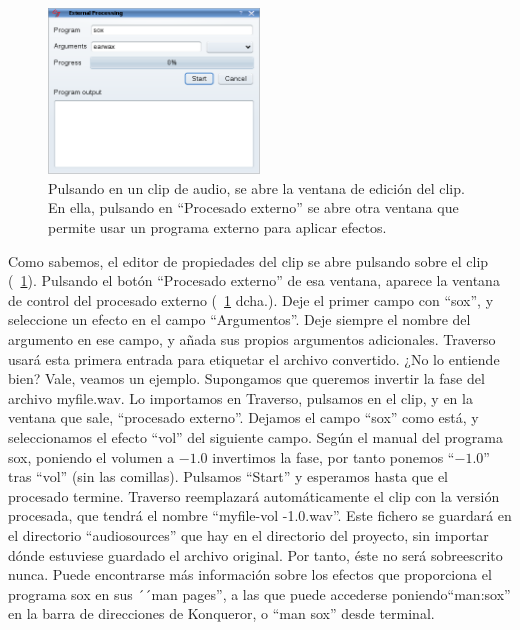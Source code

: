 \begin{figure}
	\centering
	\includegraphics[width=0.5\textwidth]{../images/external00}
	\caption{Pulsando  en un clip de audio, se abre la ventana de edición del clip. En ella, pulsando en ``Procesado externo'' se abre otra ventana que permite usar un programa externo para aplicar efectos.}
	\label{fig_external01}
\end{figure}

Como sabemos, el editor de propiedades del clip se abre pulsando  sobre el clip (\FigB~\ref{fig_external01}). Pulsando  el botón ``Procesado externo'' de esa ventana, aparece la ventana de control del procesado externo (\FigB~\ref{fig_external01} dcha.). Deje el primer campo con ``sox'', y seleccione un efecto en el campo ``Argumentos''. Deje siempre el nombre del argumento en ese campo, y añada sus propios argumentos adicionales. Traverso usará esta primera entrada para etiquetar el archivo convertido. ¿No lo entiende bien? Vale, veamos un ejemplo. Supongamos que queremos invertir la fase del archivo myfile.wav. Lo importamos en Traverso, pulsamos  en el clip, y en la ventana que sale, ``procesado externo''. Dejamos el campo ``sox'' como está, y seleccionamos el efecto ``vol'' del siguiente campo. Según el manual del programa sox, poniendo el volumen a $-1.0$ invertimos la fase, por tanto ponemos ``$-1.0$'' tras ``vol'' (sin las comillas). Pulsamos ``Start'' y esperamos hasta que el procesado termine. Traverso reemplazará automáticamente el clip con la versión procesada, que tendrá el nombre ``myfile-vol -1.0.wav''. Este fichero se guardará en el directorio ``audiosources'' que hay en el directorio del proyecto, sin importar dónde estuviese guardado el archivo original. Por tanto, éste no será sobreescrito nunca. Puede encontrarse más información sobre los efectos que proporciona el programa sox en sus ´´man pages'', a las que puede accederse poniendo``man:sox'' en la barra de direcciones de Konqueror, o ``man sox'' desde terminal.

